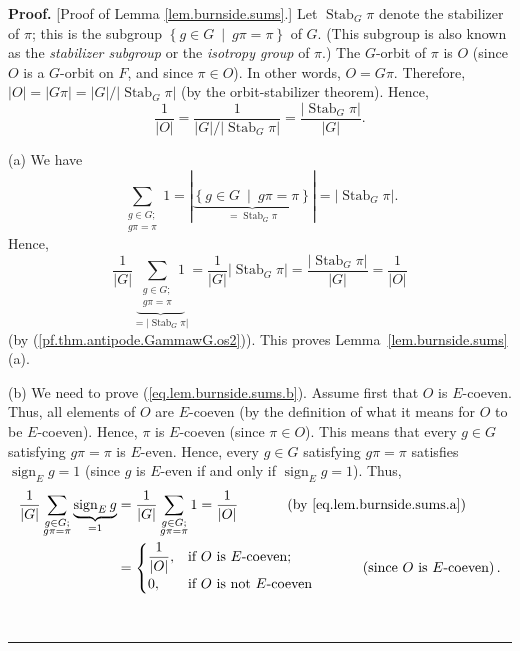 \documentclass[numbers=enddot,12pt,final,onecolumn,notitlepage,abstracton]{scrartcl}%
\theoremstyle{definition}
\newenvironment{proof}[1][Proof]{\noindent\textbf{#1.} }{\ \rule{0.5em}{0.5em}}
\let\sumnonlimits\sum
\renewcommand{\sum}{\sumnonlimits\limits}
\newcommand{\sign}{\operatorname{sign}}
\newcommand{\Stab}{\operatorname{Stab}}
\begin{document}
\begin{proof}
[Proof of Lemma \ref{lem.burnside.sums}.] Let $\Stab_{G}\pi$
denote the stabilizer of $\pi$; this is the subgroup $\left\{  g\in
G\ \mid\ g\pi=\pi\right\}  $ of $G$. (This subgroup is also known as
the \textit{stabilizer subgroup} or the \textit{isotropy group} of
$\pi$.) The $G$-orbit of $\pi$ is $O$ (since $O$
is a $G$-orbit on $F$, and since $\pi\in O$). In other words, $O = G\pi$.
Therefore,
$\left\vert O\right\vert =\left\vert G\pi\right\vert
= \left\vert G\right\vert / \left\vert \Stab_G \pi \right\vert$
(by the orbit-stabilizer theorem). Hence,
\begin{equation}
\dfrac{1}{\left\vert O\right\vert }
= \dfrac{1}{\left\vert G\right\vert / \left\vert \Stab_G \pi \right\vert}
= \dfrac{\left\vert \Stab_G \pi \right\vert}{\left\vert G\right\vert}
.
\label{pf.thm.antipode.GammawG.os2}
\end{equation}


(a) We have%
\[
\sum_{\substack{g\in G;\\g\pi=\pi}}1=\left\vert \underbrace{\left\{  g\in
G\ \mid\ g\pi=\pi\right\}  }_{= \Stab_G \pi
}\right\vert =\left\vert  \Stab_G \pi\right\vert .
\]
Hence,
\[
\dfrac{1}{\left\vert G\right\vert }
\underbrace{\sum_{\substack{g \in G;\\ g \pi = \pi}} 1}_{
 = \left\vert \Stab_G \pi \right\vert}
= \dfrac{1}{\left\vert G\right\vert }
\left\vert \Stab_G \pi \right\vert
= \dfrac{\left\vert \Stab_G \pi \right\vert }{
\left\vert G\right\vert }
= \dfrac{1}{\left\vert O\right\vert }
\]
(by (\ref{pf.thm.antipode.GammawG.os2})). This proves
Lemma~\ref{lem.burnside.sums} (a).

(b) We need to prove (\ref{eq.lem.burnside.sums.b}). Assume first that $O$ is
$E$-coeven. Thus, all elements of $O$ are $E$-coeven (by the
definition of what it means for
$O$ to be $E$-coeven). Hence, $\pi$ is $E$-coeven (since $\pi \in O$).
This means that every $g\in G$ satisfying $g\pi=\pi$ is
$E$-even. Hence, every $g\in G$ satisfying $g\pi=\pi$ satisfies
$\sign_E g = 1$ (since $g$ is $E$-even if and only if
$\sign_E g = 1$). Thus,
\begin{align*}
\dfrac{1}{\left\vert G\right\vert }\sum_{\substack{g\in G;\\g\pi=\pi
}}\underbrace{\sign_E g}_{=1} &  =\dfrac
{1}{\left\vert G\right\vert }\sum_{\substack{g\in G;\\g\pi=\pi}}1=\dfrac
{1}{\left\vert O\right\vert }\ \ \ \ \ \ \ \ \ \ \left(  \text{by
\eqref{eq.lem.burnside.sums.a}}\right)  \\
&  =%
\begin{cases}
\dfrac{1}{\left\vert O\right\vert }, & \text{if }O\text{ is }E\text{-coeven}%
;\\
0, & \text{if }O\text{ is not }E\text{-coeven}%
\end{cases}
\ \ \ \ \ \ \ \ \ \ \left(  \text{since }O\text{ is }E\text{-coeven}\right)  .
\end{align*}



\end{proof}
\end{document}

